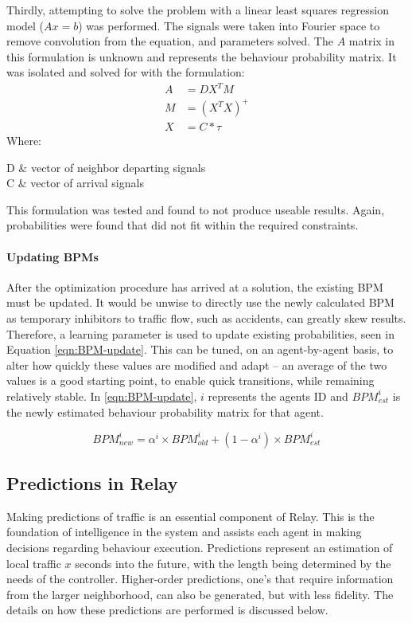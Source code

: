 \documentclass{report}
\makeatletter
\newenvironment{conditions*}
  {\par\vspace{\abovedisplayskip}\noindent\begin{tabular}{>{$}l<{$} @{${}={}$} l}}
  {\end{tabular}\par\vspace{\belowdisplayskip}}
\makeatother
\begin{document}
Thirdly, attempting to solve the problem with a linear least squares regression model ($Ax=b$) was performed. 
The signals were taken into Fourier space to remove convolution from the equation, and parameters solved. 
The $A$ matrix in this formulation is unknown and represents the behaviour probability matrix. 
It was isolated and solved for with the formulation: \\

\begin{align}
	A& = DX^{T}M \\
	M& = (X^{T}X)^{+} \\
	X& = C \ast \tau
\end{align}
Where:
\begin{conditions*}
D & vector of neighbor departing signals \\
C & vector of arrival signals
\end{conditions*}

This formulation was tested and found to not produce useable results. 
Again, probabilities were found that did not fit within the required constraints.\\

\paragraph{Updating BPMs}
After the optimization procedure has arrived at a solution, the existing BPM must be updated. 
It would be unwise to directly use the newly calculated BPM as temporary inhibitors to traffic flow, such as accidents, can greatly skew results. 
Therefore, a learning parameter is used to update existing probabilities, seen in Equation \eqref{eqn:BPM-update}. 
This can be tuned, on an agent-by-agent basis, to alter how quickly these values are modified and adapt – an average of the two values is a good starting point, to enable quick transitions, while remaining relatively stable. 
In \eqref{eqn:BPM-update}, $i$ represents the agents ID and $BPM_{est}^{i}$ is the newly estimated behaviour probability matrix for that agent.

\begin{equation}
    BPM_{new}^{i} = \alpha^{i} \times BPM_{old}^{i} + (1 - \alpha^{i}) \times BPM_{est}^{i}
    \label{eqn:BPM-update}
\end{equation}

\subsection{Predictions in Relay}
Making predictions of traffic is an essential component of Relay. 
This is the foundation of intelligence in the system and assists each agent in making decisions regarding behaviour execution. 
Predictions represent an estimation of local traffic $x$ seconds into the future, with the length being determined by the needs of the controller. 
Higher-order predictions, one’s that require information from the larger neighborhood, can also be generated, but with less fidelity. 
The details on how these predictions are performed is discussed below.
\end{document}
